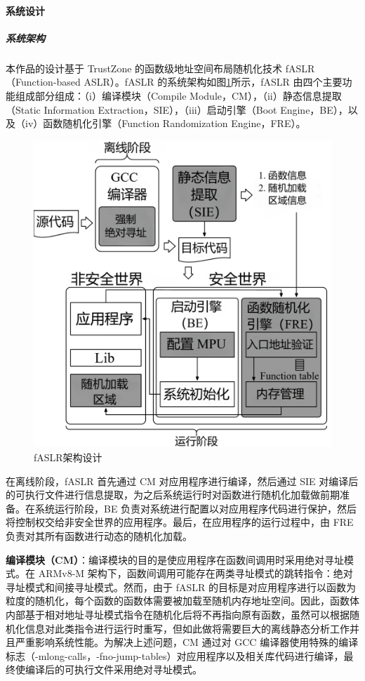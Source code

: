 \documentclass[UTF8,12pt,a4paper]{ctexart}
\numberwithin{figure}{section}
\begin{document}
\paragraph{系统设计}
\subparagraph{系统架构}
\par 本作品的设计基于 TrustZone 的函数级地址空间布局随机化技术 fASLR（Function-based ASLR）。fASLR 的系统架构如图\ref{fig:alsr_architecture}所示，fASLR 由四个主要功能组成部分组成：（i）编译模块（Compile Module，CM），（ii）静态信息提取（Static Information Extraction，SIE），（iii）启动引擎（Boot Engine，BE），以及（iv）函数随机化引擎（Function Randomization Engine，FRE）。
\begin{figure}[H]
    \centering
    \includegraphics[scale=0.3]{graph/aslr_architecture.png}
    \caption{fASLR架构设计}
    \label{fig:alsr_architecture}
\end{figure}
\par 在离线阶段，fASLR 首先通过 CM 对应用程序进行编译，然后通过 SIE 对编译后的可执行文件进行信息提取，为之后系统运行时对函数进行随机化加载做前期准备。在系统运行阶段，BE 负责对系统进行配置以对应用程序代码进行保护，然后将控制权交给非安全世界的应用程序。最后，在应用程序的运行过程中，由 FRE 负责对其所有函数进行动态的随机化加载。
\par \textbf{编译模块（CM）}：编译模块的目的是使应用程序在函数间调用时采用绝对寻址模式。在 ARMv8-M 架构下，函数间调用可能存在两类寻址模式的跳转指令：绝对寻址模式和间接寻址模式。然而，由于 fASLR 的目标是对应用程序进行以函数为粒度的随机化，每个函数的函数体需要被加载至随机内存地址空间。因此，函数体内部基于相对地址寻址模式指令在随机化后将不再指向原有函数，虽然可以根据随机化信息对此类指令进行运行时重写，但如此做将需要巨大的离线静态分析工作并且严重影响系统性能。为解决上述问题，CM 通过对 GCC 编译器使用特殊的编译标志（-mlong-calls，-fno-jump-tables）对应用程序以及相关库代码进行编译，最终使编译后的可执行文件采用绝对寻址模式。
\end{document}
